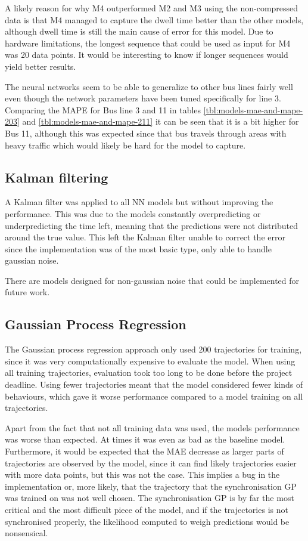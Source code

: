 A likely reason for why M4 outperformed M2 and M3 using the non-compressed data is that M4 managed to capture the dwell time better than the other models, although dwell time is still the main cause of error for this model. Due to hardware limitations, the longest sequence that could be used as input for M4 was 20 data points. It would be interesting to know if longer sequences would yield better results.

The neural networks seem to be able to generalize to other bus lines fairly well even though the network parameters have been tuned specifically for line 3. Comparing the MAPE for Bus line 3 and 11 in tables \ref{tbl:models-mae-and-mape-203} and \ref{tbl:models-mae-and-mape-211} it can be seen that it is a bit higher for Bus 11, although this was expected since that bus travels through areas with heavy traffic which would likely be hard for the model to capture.

\subsection{Kalman filtering}
A Kalman filter was applied to all NN models but without improving the performance. This was due to the models constantly overpredicting or underpredicting the time left, meaning that the predictions were not distributed around the true value. This left the Kalman filter unable to correct the error since the implementation was of the most basic type, only able to handle gaussian noise. 

There are models designed for non-gaussian noise that could be implemented for future work.

\subsection{Gaussian Process Regression}
The Gaussian process regression approach only used 200 trajectories
for training, since it was very computationally expensive to evaluate
the model. When using all training trajectories, evaluation took too
long to be done before the project deadline. Using fewer trajectories
meant that the model considered fewer kinds of behaviours, which gave
it worse performance compared to a model training on all trajectories.

Apart from the fact that not all training data was used, the models performance was worse than expected. At times it was even as bad as the baseline model. Furthermore, it would be expected that the MAE decrease as larger parts of trajectories are observed by the model, since it can find likely trajectories easier with more data points, but this was not the case. This implies a bug in the implementation or, more likely, that the trajectory that the synchronisation GP was trained on was not well chosen. The synchronisation GP is by far the most critical and the most difficult piece of the model, and if the trajectories is not synchronised properly, the likelihood computed to weigh predictions would be nonsensical. 


